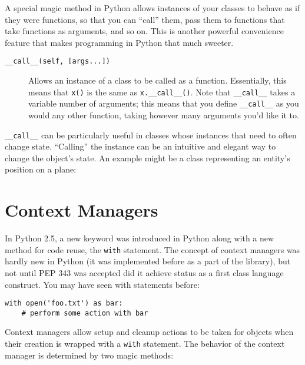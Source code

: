 \documentclass[a4paper,11pt]{article}
\newcommand{\code}[1]{\texttt{#1}}
\begin{document}
A special magic method in Python allows instances of your classes to behave as if they were functions, so that you can ``call'' them, pass them to functions that take functions as arguments, and so on. This is another powerful convenience feature that makes programming in Python that much sweeter.

\begin{description}

\item[\code{__call__(self, [args...])}]
Allows an instance of a class to be called as a function. Essentially, this means that \code{x()} is the same as \code{x.__call__()}. Note that \code{__call__} takes a variable number of arguments; this means that you define \code{__call__} as you would any other function, taking however many arguments you'd like it to.

\end{description}

\code{__call__} can be particularly useful in classes whose instances that need to often change state. ``Calling'' the instance can be an intuitive and elegant way to change the object's state. An example might be a class representing an entity's position on a plane:



\section{Context Managers}

In Python 2.5, a new keyword was introduced in Python along with a new method for code reuse, the \code{with} statement. The concept of context managers was hardly new in Python (it was implemented before as a part of the library), but not until PEP 343 was accepted did it achieve status as a first class language construct. You may have seen with statements before:

\begin{lstlisting}   
with open('foo.txt') as bar:
    # perform some action with bar
\end{lstlisting}
        
Context managers allow setup and cleanup actions to be taken for objects when their creation is wrapped with a \code{with} statement. The behavior of the context manager is determined by two magic methods:
\end{document}
